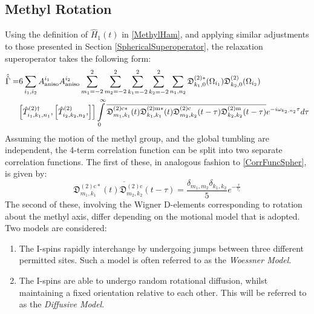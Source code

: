 \subsection{Methyl Rotation}\label{MethylRot}
Using the definition of $\hat{H}_1 (t)$ in \ref{MethylHam}, and applying similar adjustments to those presented in Section \ref{SphericalSuperoperator}, the relaxation superoperator takes the following form:
\begin{equation}
\begin{split}
\hat{\hat{\Gamma}} = &6 \sum \limits_{i_1, i_2} A_{\text{aniso}}^{i_1} A_{\text{aniso}}^{i_{2}} \sum \limits_{m_{1} = -2}^2 \sum \limits_{m_2 = -2}^2 \sum \limits_{k_1 = -2}^2 \sum \limits_{k_2 = -2}^2 \sum \limits_{n_1, n_2} \mathfrak{D}_{k_1,0}^{(2)*} (\Omega_{i_1}) \mathfrak{D}_{k_2,0}^{(2)} (\Omega_{i_2}) \\
& \comm{\hat{T}_{i_1, k_1, n_1}^{(2) \dagger}}{\comm{\hat{T}_{i_2, k_2, n_2}^{(2)}}{}} \int \limits_0^{\infty} \overline{\mathfrak{D}_{m_1,k_1}^{(2) \text{c} *}(t) \mathfrak{D}_{k_1,k_1}^{(2) \text{m} *}(t) \mathfrak{D}_{m_2,k_2}^{(2) \text{c}}(t - \tau) \mathfrak{D}_{k_2,k_2}^{(2) \text{m}}(t - \tau)} e^{-i \omega_{k_2,n_2} \tau} d \tau
\end{split}
\end{equation}
Assuming the motion of the methyl group, and the global tumbling are independent, the 4-term correlation function can be split into two separate correlation functions. The first of these, in analogous fashion to \ref{CorrFuncSpher}, is given by:
\begin{equation}
\overline{\mathfrak{D}_{m_1,k_1}^{(2) \text{c}*}(t) \mathfrak{D}_{m_2,k_2}^{(2) \text{c}} (t - \tau)} = \frac{\delta_{m_1,m_2} \delta_{k_1,k_2}}{5} e^{-\frac{\tau}{\tau_{\text{c}}}}
\end{equation}
The second of these, involving the Wigner D-elements corresponding to rotation about the methyl axis, differ depending on the motional model that is adopted. Two models are considered:
\begin{enumerate}
\item The I-spins rapidly interchange by undergoing jumps between three different permitted sites. Such a model is often referred to as the \textit{Woessner Model}\cite{RN32}.
\item The I-spins are able to undergo random rotational diffusion, whilst maintaining a fixed orientation relative to each other. This will be referred to as the \textit{Diffusive Model}.
\end{enumerate}

